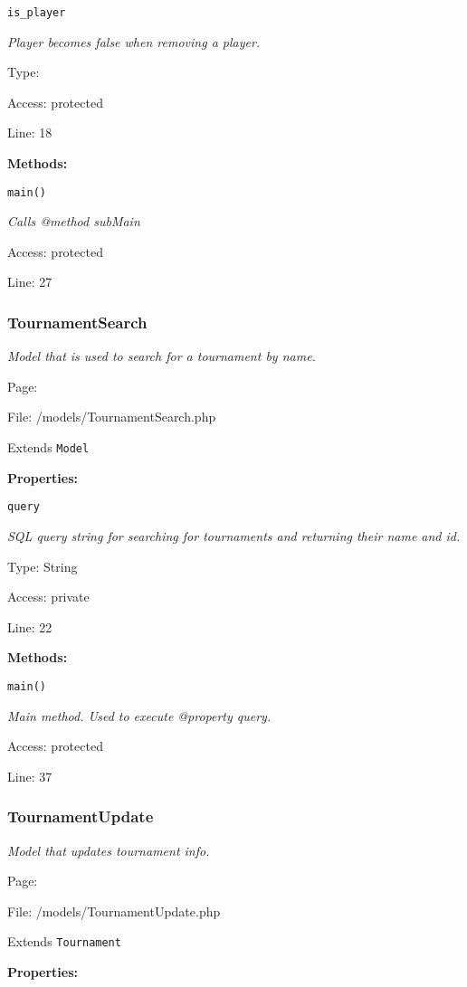 \texttt{is\_player}

{\scriptsize
\textit{Player becomes false when removing a player.}

Type: 

Access: protected

Line: 18

}
\textbf{Methods:}

\texttt{main()}

{\scriptsize
\textit{Calls @method subMain}

Access: protected

Line: 27

}

\subsubsection{TournamentSearch}\label{TournamentSearch.php.doc}
\textit{Model that is used to search for a tournament by name.}

Page: \pageref{TournamentSearch.php}

File: /models/TournamentSearch.php

Extends \texttt{Model}

\textbf{Properties:}

\texttt{query}

{\scriptsize
\textit{SQL query string for searching for tournaments and returning their name and id.}

Type: String

Access: private

Line: 22

}
\textbf{Methods:}

\texttt{main()}

{\scriptsize
\textit{Main method.
Used to execute @property query.}

Access: protected

Line: 37

}

\subsubsection{TournamentUpdate}\label{TournamentUpdate.php.doc}
\textit{Model that updates tournament info.}

Page: \pageref{TournamentUpdate.php}

File: /models/TournamentUpdate.php

Extends \texttt{Tournament}

\textbf{Properties:}

